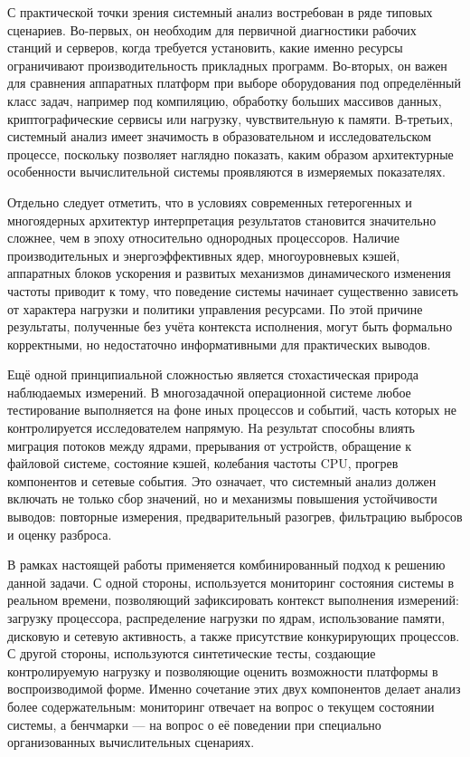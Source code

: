 С практической точки зрения системный анализ востребован в ряде типовых сценариев. Во-первых, он необходим для первичной диагностики рабочих станций и серверов, когда требуется установить, какие именно ресурсы ограничивают производительность прикладных программ. Во-вторых, он важен для сравнения аппаратных платформ при выборе оборудования под определённый класс задач, например под компиляцию, обработку больших массивов данных, криптографические сервисы или нагрузку, чувствительную к памяти. В-третьих, системный анализ имеет значимость в образовательном и исследовательском процессе, поскольку позволяет наглядно показать, каким образом архитектурные особенности вычислительной системы проявляются в измеряемых показателях.

Отдельно следует отметить, что в условиях современных гетерогенных и многоядерных архитектур интерпретация результатов становится значительно сложнее, чем в эпоху относительно однородных процессоров. Наличие производительных и энергоэффективных ядер, многоуровневых кэшей, аппаратных блоков ускорения и развитых механизмов динамического изменения частоты приводит к тому, что поведение системы начинает существенно зависеть от характера нагрузки и политики управления ресурсами. По этой причине результаты, полученные без учёта контекста исполнения, могут быть формально корректными, но недостаточно информативными для практических выводов.

Ещё одной принципиальной сложностью является стохастическая природа наблюдаемых измерений. В многозадачной операционной системе любое тестирование выполняется на фоне иных процессов и событий, часть которых не контролируется исследователем напрямую. На результат способны влиять миграция потоков между ядрами, прерывания от устройств, обращение к файловой системе, состояние кэшей, колебания частоты CPU, прогрев компонентов и сетевые события. Это означает, что системный анализ должен включать не только сбор значений, но и механизмы повышения устойчивости выводов: повторные измерения, предварительный разогрев, фильтрацию выбросов и оценку разброса.

В рамках настоящей работы применяется комбинированный подход к решению данной задачи. С одной стороны, используется мониторинг состояния системы в реальном времени, позволяющий зафиксировать контекст выполнения измерений: загрузку процессора, распределение нагрузки по ядрам, использование памяти, дисковую и сетевую активность, а также присутствие конкурирующих процессов. С другой стороны, используются синтетические тесты, создающие контролируемую нагрузку и позволяющие оценить возможности платформы в воспроизводимой форме. Именно сочетание этих двух компонентов делает анализ более содержательным: мониторинг отвечает на вопрос о текущем состоянии системы, а бенчмарки --- на вопрос о её поведении при специально организованных вычислительных сценариях.

